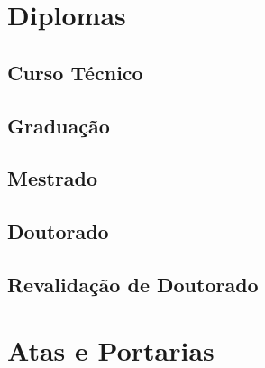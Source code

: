 \chapter{Diplomas}
\section{Curso Técnico}
\label{app:dipl}


\section{Graduação}



\section{Mestrado}



\section{Doutorado}


\section{Revalidação de Doutorado}


\chapter{Atas e Portarias}

